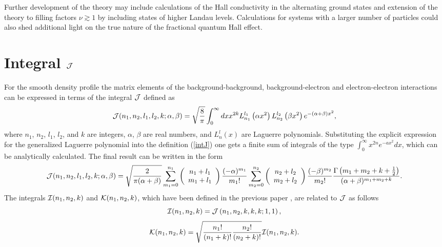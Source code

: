 \documentclass[aps,prb,10pt%
]{revtex4-2}
\def\be{\begin{equation}}
\def\ee{\end{equation}}
\begin{document}
Further development of the theory may include calculations of the Hall conductivity in the alternating ground states and extension of the theory to filling factors $\nu\gtrsim 1$ by including states of higher Landau levels. Calculations for systems with a larger number of particles could also shed additional light on the true nature of the fractional quantum Hall effect.

\appendix

\section{Integral ${\cal J}$\label{app:intJ}}

For the smooth density profile the matrix elements of the background-background, background-electron and electron-electron interactions can be expressed in terms of the integral ${\cal J}$ defined as
\be 
{\cal J}(n_1,n_2,l_1,l_2,k;\alpha,\beta)=\sqrt{\frac 8\pi}\int_0^\infty dx x^{2k} 
L_{n_1}^{l_1}\left(\alpha x^2\right)
L_{n_2}^{l_2}\left(\beta x^2\right)
e^{-(\alpha+\beta)x^2} 
\label{intJ},
\ee
where $n_1$, $n_2$, $l_1$, $l_2$, and $k$ are integers, $\alpha$, $\beta$ are real numbers, and $L_n^l(x)$ are Laguerre polynomials. Substituting the explicit expression for the generalized Laguerre polynomial into the definition (\ref{intJ}) one gets a finite sum of integrals of the type $\int_0^\infty x^{2n}e^{-ax^2}dx$, which can be analytically calculated. The final result can be written in the form
\be 
{\cal J}(n_1,n_2,l_1,l_2,k;\alpha,\beta)=
\sqrt{\frac{2}{\pi(\alpha+\beta)}}
\sum_{m_1=0}^{n_1}\left(\begin{array}{c}
n_1+l_1 \\ m_1+l_1 \\
\end{array}\right)\frac{(-\alpha)^{m_1}}{m_1!}
\sum_{m_2=0}^{n_2}\left(\begin{array}{c}
n_2+l_2 \\ m_2+l_2 \\
\end{array}\right)\frac{(-\beta)^{m_2}}{m_2!}
  \frac{\Gamma\left(m_1+m_2+k+\frac 12\right)}{(\alpha+\beta)^{m_1+m_2+k}}.
\label{intJsolution}
\ee
The integrals ${\cal I}(n_1,n_2,k)$ and ${\cal K}(n_1,n_2,k)$, which have been defined in the previous paper \cite{Mikhailov23a}, are related to ${\cal J}$ as follows
\be 
{\cal I}(n_1,n_2,k)=
{\cal J}\left(n_1,n_2,k,k, k;1,1\right),
\label{intI}
\ee
\be 
{\cal K}(n_1,n_2,k)=\sqrt{\frac{n_1!}{(n_1+k)!}\frac{n_2!}{(n_2+k)!}}{\cal I}(n_1,n_2,k).
\label{intK}
\ee



% 

\end{document}
